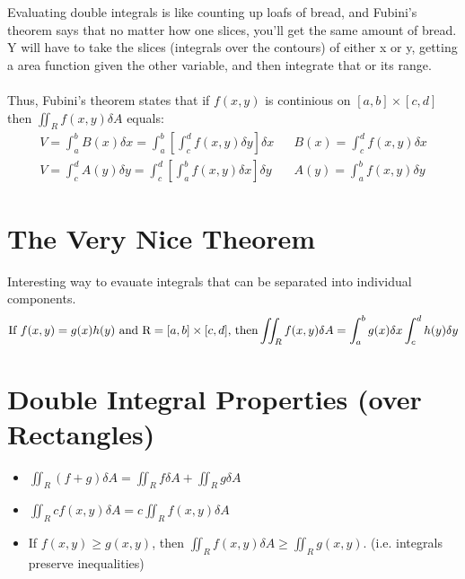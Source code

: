 \documentclass{article}
\begin{document}
Evaluating double integrals is like counting up loafs of bread, and Fubini's theorem says that no matter how one slices, you'll get the same amount of bread. Y will have to take the slices (integrals over the contours) of either x or y, getting a area function given the other variable, and then integrate that or its range. \\ ~ \\
Thus, Fubini's theorem states that if $f(x, y)$ is continious on $[a, b] \times [c, d]$ then $\iint_{R} f(x, y) \delta A$ equals:
\begin{align*}
    V = \int_{a}^{b} B(x) \delta x = \int_{a}^{b} \left[ \int_{c}^{d} f(x,y) \delta y \right] \delta x  &  & B(x) = \int_{c}^{d} f(x, y) \delta x \\
    V = \int_{c}^{d} A(y) \delta y = \int_{c}^{d} \left[ \int_{a}^{b} f(x, y) \delta x \right] \delta y &  & A(y) = \int_{a}^{b} f(x, y) \delta y
\end{align*}


\section {The Very Nice Theorem}

Interesting way to evauate integrals that can be separated into individual components. 
$$\text{If } f(x, y) = g(x)h(y) \text{ and R} = [a, b] \times [c, d] \text{, then} \\ \iint_{R} f(x, y) \delta A = \int_{a}^{b} g(x) \delta x \int_{c}^{d} h(y) \delta y $$

\section{Double Integral Properties (over Rectangles)}

\begin{itemize}
    \item  $\iint_{R} (f + g) \delta A = \iint_{R} f \delta A + \iint_{R} g \delta A$
    \item $\iint_{R} cf(x,y) \delta A = c \iint_{R} f(x, y) \delta A$
    \item If $f(x, y) \ge g(x, y)$, then $\iint_{R} f(x, y) \delta A \ge \iint_{R} g(x, y)$. (i.e. integrals preserve inequalities)
\end{itemize}
\end{document}
